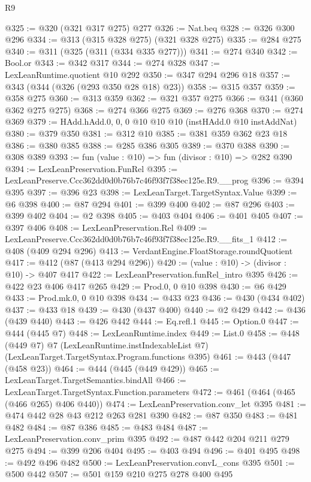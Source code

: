 \begin{lexlean}{R9}
\begin{coremodule}
@325 := @320 (@321 @317 @275) @277
@326 := Nat.beq
@328 := @326 @300 @296
@334 := @313 (@315 @328 @275) (@321 @328 @275)
@335 := @284 @275
@340 := @311 (@325 (@311 (@334 @335 @277)))
@341 := @274 @340
@342 := Bool.or
@343 := @342 @317
@344 := @274 @328
@347 := LexLeanRuntime.quotient @10 @292
@350 := @347 @294 @296 @18
@357 := @343 (@344 (@326 (@293 @350 @28 @18) @23))
@358 := @315 @357
@359 := @358 @275
@360 := @313 @359
@362 := @321 @357 @275
@366 := @341 (@360 @362 @275 @275)
@368 := @274 @366 @275
@369 := @276 @368
@370 := @274 @369
@379 := HAdd.hAdd.{0, 0, 0} @10 @10 @10 (instHAdd.{0} @10 instAddNat)
@380 := @379 @350
@381 := @312 @10
@385 := @381 @359 @362 @23 @18
@386 := @380 @385
@388 := @285 @386 @305
@389 := @370 @388
@390 := @308 @389
@393 := fun (value : @10) => fun (divisor : @10) => @282 @390
@394 := LexLeanPreservation.FunRel
@395 := LexLeanPreserve.Ccc362dd0d0b76b7c46f93f7f38ec125e.R9.__prog
@396 := @394 @395
@397 := @396 @23
@398 := LexLeanTarget.TargetSyntax.Value
@399 := @6 @398
@400 := @87 @294
@401 := @399 @400
@402 := @87 @296
@403 := @399 @402
@404 := @2 @398
@405 := @403 @404
@406 := @401 @405
@407 := @397 @406
@408 := LexLeanPreservation.Rel
@409 := LexLeanPreserve.Ccc362dd0d0b76b7c46f93f7f38ec125e.R9.__fits_1
@412 := @408 (@409 @294 @296)
@413 := VerdantEngine.FloatStorage.roundQuotient
@417 := @412 (@87 (@413 @294 @296))
@420 := (value : @10) -> (divisor : @10) -> @407 @417
@422 := LexLeanPreservation.funRel_intro @395
@426 := @422 @23 @406 @417 @265
@429 := Prod.{0, 0} @10 @398
@430 := @6 @429
@433 := Prod.mk.{0, 0} @10 @398
@434 := @433 @23
@436 := @430 (@434 @402)
@437 := @433 @18
@439 := @430 (@437 @400)
@440 := @2 @429
@442 := @436 (@439 @440)
@443 := @426 @442
@444 := Eq.refl.{1}
@445 := Option.{0}
@447 := @444 (@445 @7)
@448 := LexLeanRuntime.index
@449 := List.{0}
@458 := @448
    (@449 @7)
    @7
    (LexLeanRuntime.instIndexableList @7)
    (LexLeanTarget.TargetSyntax.Program.functions @395)
@461 := @443 (@447 (@458 @23))
@464 := @444 (@445 (@449 @429))
@465 := LexLeanTarget.TargetSemantics.bindAll
@466 := LexLeanTarget.TargetSyntax.Function.parameters
@472 := @461 (@464 (@465 (@466 @265) @406 @440))
@474 := LexLeanPreservation.conv_let @395
@481 := @474 @442 @28 @43 @212 @263 @281 @390
@482 := @87 @350
@483 := @481 @482
@484 := @87 @386
@485 := @483 @484
@487 := LexLeanPreservation.conv_prim @395
@492 := @487 @442 @204 @211 @279 @275
@494 := @399 @206 @404
@495 := @403 @494
@496 := @401 @495
@498 := @492 @496 @482
@500 := LexLeanPreservation.convL_cons @395
@501 := @500 @442
@507 := @501 @159 @210 @275 @278 @400 @495

\end{coremodule}
\end{lexlean}
